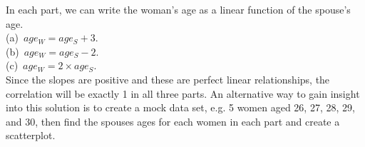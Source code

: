 In each part, we can write the woman's age as a linear function of 
the spouse's age. \\
(a)~$age_{W} = age_{S} + 3$. \\
(b)~$age_{W} = age_{S} - 2$. \\
(c)~$age_{W} = 2 \times age_{S}$. \\
Since the slopes are positive and these are perfect linear 
relationships, the correlation will be exactly 1 in all three parts. 
An alternative way to gain insight into this solution is to create a 
mock data set, e.g. 5 women aged 26, 27, 28, 29, and 30, then find the 
spouses ages for each women in each part and create a scatterplot.
